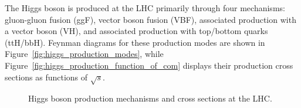 
The Higgs boson is produced at the LHC primarily through four mechanisms: gluon-gluon fusion (ggF), vector boson fusion (VBF), associated production with a vector boson (VH), and associated production with top/bottom quarks (ttH/bbH). Feynman diagrams for these production modes are shown in Figure~\ref{fig:higgs_production_modes}, while Figure~\ref{fig:higgs_production_function_of_com} displays their production cross sections as functions of $\sqrt{s}$. 

\begin{figure}[pht]
  \centering
  \hspace{0.01\textwidth}
  \caption{Higgs boson production mechanisms and cross sections at the LHC.}
\end{figure}

